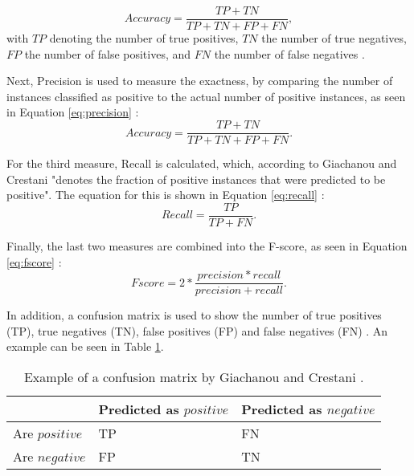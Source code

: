 \begin{equation}
    \label{eq:accuracy}
    Accuracy = \frac{TP + TN}{TP + TN + FP + FN},
\end{equation}
with $TP$ denoting the number of true positives, $TN$ the number of true negatives, $FP$ the number of false positives, and $FN$ the number of false negatives \cite{DBLP:journals/csur/GiachanouC16}. 

Next, Precision is used to measure the exactness, by comparing the number of instances classified as positive to the actual number of positive instances, as seen in Equation \eqref{eq:precision} \cite{DBLP:journals/csur/GiachanouC16}:
\begin{equation}
    \label{eq:precision}
    Accuracy = \frac{TP + TN}{TP + TN + FP + FN}.
\end{equation}

For the third measure, Recall is calculated, which, according to Giachanou and Crestani "denotes the fraction of positive instances that were predicted to be positive". The equation for this is shown in Equation \eqref{eq:recall} \cite{DBLP:journals/csur/GiachanouC16}:
\begin{equation}
    \label{eq:recall}
    Recall = \frac{TP}{TP + FN}.
\end{equation}

Finally, the last two measures are combined into the F-score, as seen in Equation \eqref{eq:fscore} \cite{DBLP:journals/csur/GiachanouC16}:
\begin{equation}
    \label{eq:fscore}
    Fscore = 2*\frac{precision * recall}{precision + recall}.
\end{equation}

In addition, a confusion matrix is used to show the number of true positives (TP), true negatives (TN), false positives (FP) and false negatives (FN) \cite{DBLP:journals/csur/GiachanouC16}. An example can be seen in Table \ref{tab:conf_example}.

\begin{table}[h!]
\centering
\caption{Example of a confusion matrix by Giachanou and Crestani \cite[p.~28:11]{DBLP:journals/csur/GiachanouC16}.}
\begin{tabular}{ |p{3cm}||p{3cm}|p{3cm}| }
 \hline
  &          Predicted as $positive$ &Predicted as $negative$  \\
 \hline
 Are $positive$        & TP&            FN\\
  \hline
 Are $negative$  &FP&                     TN\\
 \hline

\end{tabular}
\label{tab:conf_example}
\end{table}


